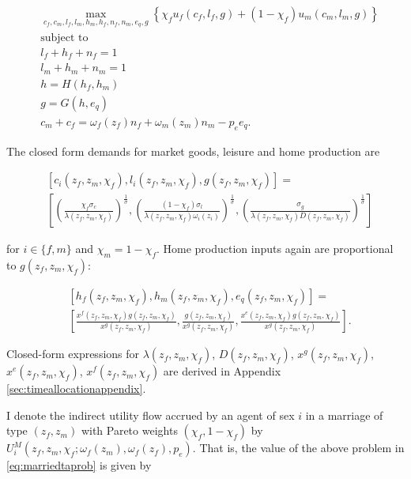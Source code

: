 \documentclass[12pt]{article}
\begin{document}
\begin{align}
	& \max_{c_f,c_m,l_f,l_m,h_m,h_f,n_f,n_m,e_q,g} \left\lbrace \chi_f u_f\left(c_f,l_f,g\right)+\left(1-\chi_f\right) u_m\left(c_m,l_m,g\right) \right\rbrace \label{eq:marriedtaprob} \\
	& \text{subject to} \nonumber \\
	& l_f+h_f+n_f = 1 \nonumber \\
	& l_m+h_m+n_m = 1 \nonumber \\
	& h = H\left(h_f,h_m\right) \nonumber \\
	& g = G\left(h,e_q\right) \nonumber \\
	& c_m+c_f = \omega_f(z_f)n_f+\omega_m(z_m)n_m-p_e e_q. \nonumber
\end{align}

The closed form demands for market goods, leisure and home production are

\begin{align*}
	& \left[c_i(z_f,z_m,\chi_f),l_i(z_f,z_m,\chi_f),g(z_f,z_m,\chi_f)\right] = \\ & \left[ \left(\frac{\chi_f \sigma_c}{\lambda(z_f,z_m,\chi_f)}\right)^{\frac{1}{\sigma}}, \left(\frac{\left(1-\chi_f\right)\sigma_l}{\lambda(z_f,z_m,\chi_f)\omega_i(z_i)}\right)^{\frac{1}{\sigma}},\left(\frac{\sigma_g}{\lambda(z_f,z_m,\chi_f) D(z_f,z_m,\chi_f)}\right)^{\frac{1}{\sigma}}   \right]
\end{align*}

for $i\in\{f,m\}$ and $\chi_m = 1-\chi_f$. Home production inputs again are proportional to $g(z_f,z_m,\chi_f)$:

\begin{align*}
	&\left[h_f(z_f,z_m,\chi_f),h_m(z_f,z_m,\chi_f),e_q(z_f,z_m,\chi_f)\right] = \\ & \left[\frac{x^f(z_f,z_m,\chi_f)g(z_f,z_m,\chi_f)}{x^g(z_f,z_m,\chi_f)},\frac{g(z_f,z_m,\chi_f)}{x^g(z_f,z_m,\chi_f)},\frac{x^e(z_f,z_m,\chi_f)g(z_f,z_m,\chi_f)}{x^g(z_f,z_m,\chi_f)}\right].
\end{align*}

Closed-form expressions for $\lambda(z_f,z_m,\chi_f)$, $D(z_f,z_m,\chi_f)$, $x^g(z_f,z_m,\chi_f)$, $x^e(z_f,z_m,\chi_f)$, $x^f(z_f,z_m,\chi_f)$ are derived in Appendix \ref{sec:timeallocationappendix}.

I denote the indirect utility flow accrued by an agent of sex $i$ in a marriage of type $\left(z_f,z_m\right)$ with Pareto weights $\left(\chi_f,1-\chi_f\right)$ by $U_i^M\left(z_f,z_m,\chi_f;\omega_f(z_m),\omega_f(z_f),p_e\right)$. That is, the value of the above problem in \ref{eq:marriedtaprob} is given by
\end{document}
